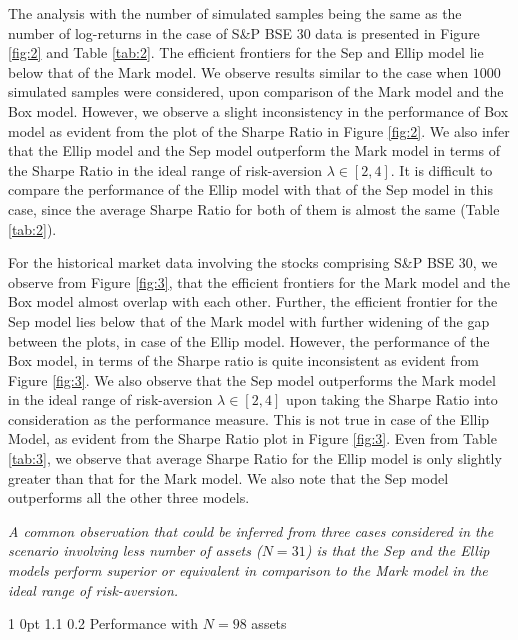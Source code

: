 \documentclass[12pt]{article}
\makeatletter
\numberwithin{equation}{section}
\renewcommand{\subsection}{
  \@startsection
  {subsection}%
  {1}%
  {0pt}%
  {1.1\baselineskip}%
  {0.2\baselineskip}%
  {\sc \centering}%
}
\makeatother
\begin{document}
The analysis with the number of simulated samples being the same as the number of log-returns in the case of S\&P BSE 30 data is presented in Figure \ref{fig:2} and Table \ref{tab:2}. The efficient frontiers for the Sep and Ellip model lie below that of the Mark model. We observe results similar to the case when $1000$ simulated samples were considered, upon comparison of the Mark model and the Box model. However, we observe a slight inconsistency in the performance of Box model as evident from the plot of the Sharpe Ratio in Figure \ref{fig:2}.  We also infer that the Ellip model and the Sep model outperform the Mark model in terms of the Sharpe Ratio in the ideal range of risk-aversion $\lambda \in [2,4]$. It is difficult to compare the performance of the Ellip model with that of the Sep model in this case, since the average Sharpe Ratio for both of them is almost the same (Table \ref{tab:2}).

For the historical market data involving the stocks comprising S\&P BSE 30, we observe from Figure \ref{fig:3}, that the efficient frontiers for the Mark model and the Box model almost overlap with each other. Further, the efficient frontier for the Sep model lies below that of the Mark model with further widening of the gap between the plots, in case of the Ellip model. However, the performance of the Box model, in terms of the Sharpe ratio is quite inconsistent as evident from Figure \ref{fig:3}. We also observe that the Sep model outperforms the Mark model in the ideal range of risk-aversion $\lambda\in [2,4]$ upon taking the Sharpe Ratio into consideration as the performance measure. This is not true in case of the Ellip Model, as evident from the Sharpe Ratio plot in Figure \ref{fig:3}. Even from Table \ref{tab:3}, we observe that average Sharpe Ratio for the Ellip model is only slightly greater than that for the Mark model. We also note that the Sep model outperforms all the other three models.

\textit{A common observation that could be inferred from three cases considered in the scenario involving less number of assets ($N=31$) is that the Sep and the Ellip models perform superior or equivalent in comparison to the Mark model in the ideal range of risk-aversion.}

\subsection{Performance with $N=98$ assets}
\end{document}
